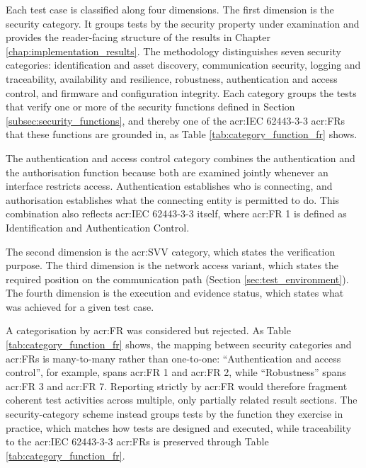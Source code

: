 Each test case is classified along four dimensions. The first dimension is the security category. It groups tests by the security property under examination and provides the reader-facing structure of the results in Chapter \ref{chap:implementation_results}. The methodology distinguishes seven security categories: identification and asset discovery, communication security, logging and traceability, availability and resilience, robustness, authentication and access control, and firmware and configuration integrity. Each category groups the tests that verify one or more of the security functions defined in Section \ref{subsec:security_functions}, and thereby one of the \gls{acr:IEC} 62443-3-3 \glspl{acr:FR} that these functions are grounded in, as Table \ref{tab:category_function_fr} shows. 

The authentication and access control category combines the authentication and the authorisation function because both are examined jointly whenever an interface restricts access. Authentication establishes who is connecting, and authorisation establishes what the connecting entity is permitted to do. This combination also reflects \gls{acr:IEC} 62443-3-3 itself, where \gls{acr:FR} 1 is defined as Identification and Authentication Control. 

The second dimension is the \gls{acr:SVV} category, which states the verification purpose. 
The third dimension is the network access variant, which states the required position on the communication path (Section \ref{sec:test_environment}). 
The fourth dimension is the execution and evidence status, which states what was achieved for a given test case. 

A categorisation by \gls{acr:FR} was considered but rejected. As Table \ref{tab:category_function_fr} shows, the mapping between security categories and \glspl{acr:FR} is many-to-many rather than one-to-one: ``Authentication and access control'', for example, spans \gls{acr:FR} 1 and \gls{acr:FR} 2, while ``Robustness'' spans \gls{acr:FR} 3 and \gls{acr:FR} 7. Reporting strictly by \gls{acr:FR} would therefore fragment coherent test activities across multiple, only partially related result sections. The security-category scheme instead groups tests by the function they exercise in practice, which matches how tests are designed and executed, while traceability to the \gls{acr:IEC} 62443-3-3 \glspl{acr:FR} is preserved through Table \ref{tab:category_function_fr}. 


